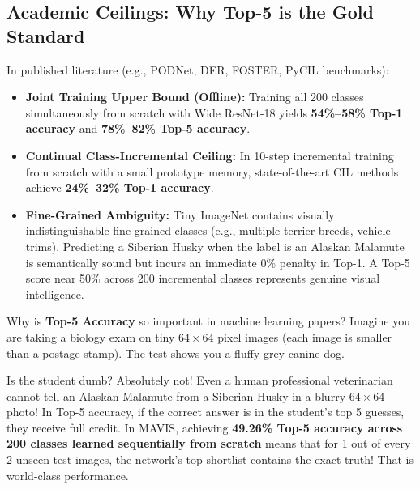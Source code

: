 \documentclass[11pt,a4paper]{article}
\begin{document}
\subsection{Academic Ceilings: Why Top-5 is the Gold Standard}
In published literature (e.g., PODNet, DER, FOSTER, PyCIL benchmarks):
\begin{itemize}[leftmargin=*]
    \item \textbf{Joint Training Upper Bound (Offline):} Training all 200 classes simultaneously from scratch with Wide ResNet-18 yields \textbf{54\%--58\% Top-1 accuracy} and \textbf{78\%--82\% Top-5 accuracy}.
    \item \textbf{Continual Class-Incremental Ceiling:} In 10-step incremental training from scratch with a small prototype memory, state-of-the-art CIL methods achieve \textbf{24\%--32\% Top-1 accuracy}.
    \item \textbf{Fine-Grained Ambiguity:} Tiny ImageNet contains visually indistinguishable fine-grained classes (e.g., multiple terrier breeds, vehicle trims). Predicting a Siberian Husky when the label is an Alaskan Malamute is semantically sound but incurs an immediate 0\% penalty in Top-1. A Top-5 score near 50\% across 200 incremental classes represents genuine visual intelligence.
\end{itemize}

\begin{callout}
Why is \textbf{Top-5 Accuracy} so important in machine learning papers?\newline
Imagine you are taking a biology exam on tiny $64 \times 64$ pixel images (each image is smaller than a postage stamp). The test shows you a fluffy grey canine dog.
Is the student dumb? Absolutely not! Even a human professional veterinarian cannot tell an Alaskan Malamute from a Siberian Husky in a blurry $64 \times 64$ photo! In Top-5 accuracy, if the correct answer is in the student's top 5 guesses, they receive full credit. In MAVIS, achieving \textbf{49.26\% Top-5 accuracy across 200 classes learned sequentially from scratch} means that for 1 out of every 2 unseen test images, the network's top shortlist contains the exact truth! That is world-class performance.
\end{callout}
\end{document}
